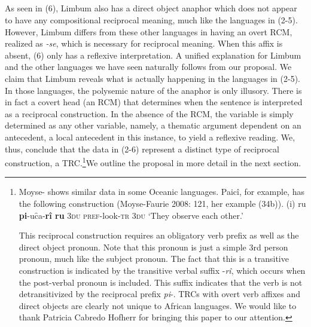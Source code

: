 \documentclass[output=paper]{langsci/langscibook}
\begin{document}
\begin{listWWviiiNumxlileveli}
\item \ea\label{ex:}
\\
\ea\label{ex:}
\\
\ea\label{ex:}
\\
\ea\label{ex:}
\\
\end{listWWviiiNumxlileveli}

As seen in (6), Limbum also has a direct object anaphor which does not appear to have any compositional reciprocal meaning, much like the languages in (2-5). However, Limbum differs from these other languages in having an overt RCM, realized as \textit{{}-se}, which is necessary for reciprocal meaning. When this affix is absent, (6) only has a reflexive interpretation. A unified explanation for Limbum and the other languages we have seen naturally follows from our proposal. We claim that Limbum reveals what is actually happening in the languages in (2-5). In those languages, the polysemic nature of the anaphor is only illusory. There is in fact a covert head (an RCM) that determines when the sentence is interpreted as a reciprocal construction. In the absence of the RCM, the variable is simply determined as any other variable, namely, a thematic argument dependent on an antecedent, a local antecedent in this instance, to yield a reflexive reading. We, thus, conclude that the data in (2-6) represent a distinct type of reciprocal construction, a TRC.\footnote{ Moyse-\citet{Faurie2008} shows similar data in some Oceanic languages. Paicî, for example, has the following construction (Moyse-Faurie 2008: 121, her example (34b)).
(i)  ru  \textbf{pi}{}-uc̑a-\textbf{rî  ru}
\textsc{  }\textsc{3du}  \textsc{pref}{}-look-\textsc{tr}  \textsc{3du}
  ‘They observe each other.’

This reciprocal construction requires an obligatory verb prefix as well as the direct object pronoun. Note that this pronoun is just a simple 3rd person pronoun, much like the subject pronoun. The fact that this is a transitive construction is indicated by the transitive verbal suffix -\textit{rî}, which occurs when the post-verbal pronoun is included. This suffix indicates that the verb is not detransitivized by the reciprocal prefix \textit{pi}{}-. TRCs with overt verb affixes and direct objects are clearly not unique to African languages. We would like to thank Patricia Cabredo Hofherr for bringing this paper to our attention.}\textstyleCommentReference{ }We outline the proposal in more detail in the next section.
\end{document}
